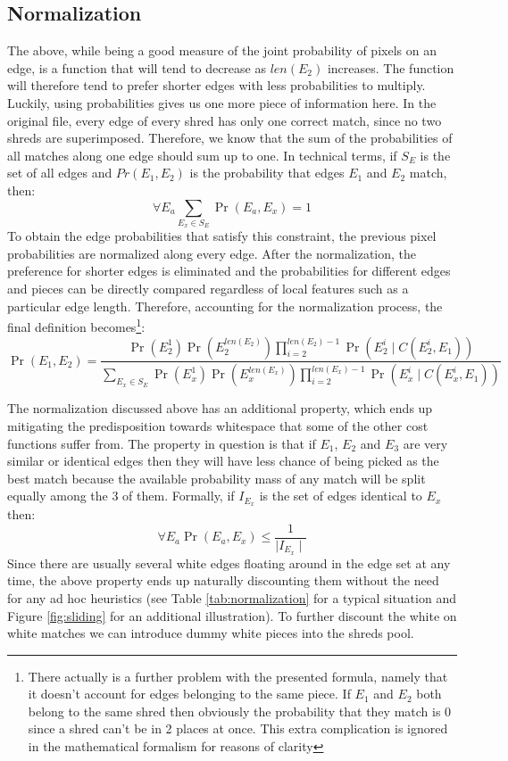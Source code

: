 \subsection{Normalization}\label{sect:norm}
The above, while being a good measure of the joint probability of pixels on an edge, is a function that will tend to decrease as $len(E_2)$ increases. The function will therefore tend to prefer shorter edges with less probabilities to multiply. Luckily, using probabilities gives us one more piece of information here. In the original file, every edge of every shred has only one correct match, since no two shreds are superimposed. Therefore, we know that the sum of the probabilities of all matches along one edge should sum up to one. In technical terms, if \(S_E\) is the set of all edges and \(Pr(E_1,E_2)\) is the probability that edges $E_1$ and $E_2$ match, then: \[\forall E_a \sum_{E_x \in S_E} \Pr(E_a,E_x) = 1 \] To obtain the edge probabilities that satisfy this constraint, the previous pixel probabilities are normalized along every edge. After the normalization, the preference for shorter edges is eliminated and the probabilities for different edges and pieces can be directly compared regardless of local features such as a particular edge length. Therefore, accounting for the normalization process, the final definition becomes\footnote{There actually is a further problem with the presented formula, namely that it doesn't account for edges belonging to the same piece. If \(E_1\) and \(E_2\) both belong to the same shred then obviously the probability that they match is 0 since a shred can't be in 2 places at once. This extra complication is ignored in the mathematical formalism for reasons of clarity}:  \[ \Pr(E_1,E_2) = \frac{\Pr(E_2^1) \Pr(E_2^{len(E_2)}) \prod_{i=2}^{len(E_2)-1} \Pr(E_2^i \mid C(E_2^i,E_1))}{\sum_{E_x \in S_E} \Pr(E_x^1) \Pr(E_x^{len(E_x)}) \prod_{i=2}^{len(E_x)-1} \Pr(E_x^i \mid C(E_x^i,E_1)) } \]


The normalization discussed above has an additional property, which ends up mitigating the predisposition towards whitespace that some of the other cost functions suffer from. The property in question is that if \(E_1\), \(E_2\) and \(E_3\) are very similar or identical edges then they will have less chance of being picked as the best match because the available probability mass of any match will be split equally among the 3 of them. Formally, if \(I_{E_x}\) is the set of edges identical to \(E_x\) then: \[\forall E_a \Pr(E_a,E_x) \leq \frac{1}{\mid I_{E_x} \mid}\] Since there are usually several white edges floating around in the edge set at any time, the above property ends up naturally discounting them without the need for any ad hoc heuristics (see Table \ref{tab:normalization} for a typical situation and Figure \ref{fig:sliding} for an additional illustration). To further discount the white on white matches we can introduce dummy white pieces into the shreds pool.

